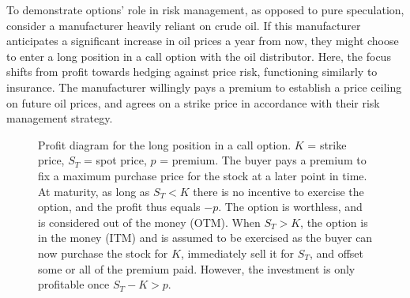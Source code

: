 \documentclass[english,12pt,a4paper,pdftex,sci,utf8]{aaltothesis}
\begin{document}
To demonstrate options' role in risk management, as opposed to pure speculation, consider a manufacturer heavily reliant on crude oil. If this manufacturer anticipates a significant increase in oil prices a year from now, they might choose to enter a long position in a call option with the oil distributor. Here, the focus shifts from profit towards hedging against price risk, functioning similarly to insurance. The manufacturer willingly pays a premium to establish a price ceiling on future oil prices, and agrees on a strike price in accordance with their risk management strategy.

\begin{center}
\begin{figure}[H]
\centering
    \caption{Profit diagram for the long position in a call option. $K$ = strike price, $S_T$ = spot price, $p$ = premium. The buyer pays a premium to fix a maximum purchase price for the stock at a later point in time. At maturity, as long as $S_T < K$ there is no incentive to exercise the option, and the profit thus equals $-p$. The option is worthless, and is considered out of the money (OTM). When $S_T > K$, the option is in the money (ITM) and is assumed to be exercised as the buyer can now purchase the stock for $K$, immediately sell it for $S_T$, and offset some or all of the premium paid. However, the investment is only profitable once $S_T - K > p$.}
    \label{fig:long_call_payoff}
\end{figure}
\end{center}
\end{document}
